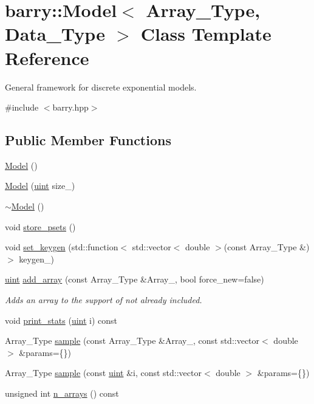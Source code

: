 \hypertarget{classbarry_1_1_model}{}\section{barry\+:\+:Model$<$ Array\+\_\+\+Type, Data\+\_\+\+Type $>$ Class Template Reference}
\label{classbarry_1_1_model}


General framework for discrete exponential models.  




{\ttfamily \#include $<$barry.\+hpp$>$}

\subsection*{Public Member Functions}
\begin{DoxyCompactItemize}
\item 
\hyperlink{classbarry_1_1_model_a38122122aa4eb799b90ed1ee49b9410c}{Model} ()
\item 
\hyperlink{classbarry_1_1_model_a841a883c666ecd9b07385bfb36078bc5}{Model} (\hyperlink{namespacebarry_a11dfc53ddb4672278319aa04f1e09a6c}{uint} size\+\_\+)
\item 
\hyperlink{classbarry_1_1_model_ab01cbe8e9e9c6ceb56463dbe6be90059}{$\sim$\+Model} ()
\item 
void \hyperlink{classbarry_1_1_model_afd6d7130b41f92e5ec1984ea53c83720}{store\+\_\+psets} ()
\item 
void \hyperlink{classbarry_1_1_model_afa4736153fa419e1f141839eda735dfe}{set\+\_\+keygen} (std\+::function$<$ std\+::vector$<$ double $>$(const Array\+\_\+\+Type \&)$>$ keygen\+\_\+)
\item 
\hyperlink{namespacebarry_a11dfc53ddb4672278319aa04f1e09a6c}{uint} \hyperlink{classbarry_1_1_model_a28ad7090cb5b3f3be9e24d9aef15ce75}{add\+\_\+array} (const Array\+\_\+\+Type \&Array\+\_\+, bool force\+\_\+new=false)
\begin{DoxyCompactList}\small\item\em Adds an array to the support of not already included. \end{DoxyCompactList}\item 
void \hyperlink{classbarry_1_1_model_a1109a7cacf9993aa3189240bc41d5bec}{print\+\_\+stats} (\hyperlink{namespacebarry_a11dfc53ddb4672278319aa04f1e09a6c}{uint} i) const
\item 
Array\+\_\+\+Type \hyperlink{classbarry_1_1_model_ab128d184427583d7b0e296a668047200}{sample} (const Array\+\_\+\+Type \&Array\+\_\+, const std\+::vector$<$ double $>$ \&params=\{\})
\item 
Array\+\_\+\+Type \hyperlink{classbarry_1_1_model_a7f694a828e10372f94d856452dde7610}{sample} (const \hyperlink{namespacebarry_a11dfc53ddb4672278319aa04f1e09a6c}{uint} \&i, const std\+::vector$<$ double $>$ \&params=\{\})
\item 
unsigned int \hyperlink{classbarry_1_1_model_a35678412d71c9f96aa19099c72179f3d}{n\+\_\+arrays} () const
\end{DoxyCompactItemize}
